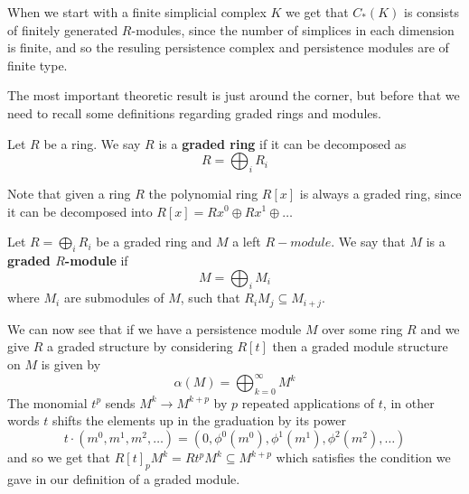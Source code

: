 When we start with a finite simplicial complex $K$ we get that $C_{*}(K)$ is consists of finitely generated $R$-modules, since the number of simplices in each dimension is finite, and so the resuling persistence complex and persistence modules are of finite type.

The most important theoretic result is just around the corner, but before that we need to recall some definitions regarding graded rings and modules.

\begin{definition}
  Let $R$ be a ring. We say $R$ is a \textbf{graded ring} if it can be decomposed as
  \[ R = \bigoplus_{i} R_{i}\]
\end{definition}
Note that given a ring $R$ the polynomial ring $R[x]$ is always a graded ring, since it can be decomposed into $R[x] = Rx^{0} \oplus Rx^{1} \oplus \dots$
\begin{definition}
  Let $R = \bigoplus_{{i}} R_{i}$ be a graded ring and $M$ a left $R-module$. We say that $M$ is a \textbf{graded $R$-module} if
  \[M = \bigoplus_{i} M_{i} \]
  where $M_{i}$ are submodules of $M$, such that $R_{i}M_{j} \subseteq M_{i+j}$.
\end{definition}

We can now see that if we have a persistence module $M$ over some ring $R$ and we give $R$ a graded structure by considering $R[t]$ then a graded module structure on $M$ is given by
\[ \alpha(M) = \bigoplus^{\infty}_{k=0} M^{k}\]
The monomial $t^{p}$ sends $M^{k} \to M^{k+p}$ by $p$ repeated applications of $t$, in other words $t$ shifts the elements up in the graduation by its power
\[ t \cdot (m^{0}, m^{1}, m^{2}, \dots  ) = (0, \phi^{0}(m^{0}), \phi^{1}(m^{1}),\phi^{2}(m^{2}),\dots) \]
and so we get that $R[t]_{p}M^{k} = Rt^{p}M^{k} \subseteq M^{k+p}$ which satisfies the condition we gave in our definition of a graded module.

